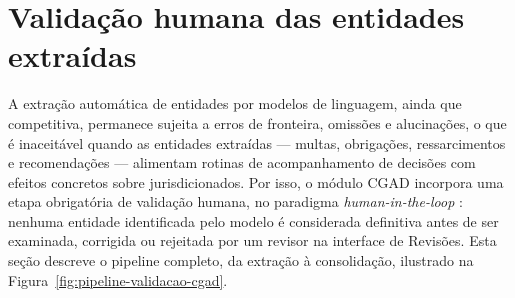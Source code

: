 %
%
%

\section{Validação humana das entidades extraídas}
\label{sec:validacao-revisoes}

A extração automática de entidades por modelos de linguagem, ainda que
competitiva, permanece sujeita a erros de fronteira, omissões e alucinações,
o que é inaceitável quando as entidades extraídas --- multas, obrigações,
ressarcimentos e recomendações --- alimentam rotinas de acompanhamento de
decisões com efeitos concretos sobre jurisdicionados. Por isso, o módulo CGAD
incorpora uma etapa obrigatória de validação humana, no paradigma
\emph{human-in-the-loop} \cite{monarch2021humanintheloop, wu2022hitl}: nenhuma
entidade identificada pelo modelo é considerada definitiva antes de ser
examinada, corrigida ou rejeitada por um revisor na interface de Revisões.
Esta seção descreve o pipeline completo, da extração à consolidação,
ilustrado na Figura~\ref{fig:pipeline-validacao-cgad}.

